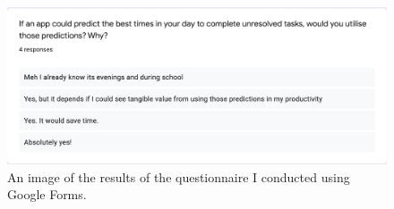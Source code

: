 \begin{figure}[H]
    \centering
    \includegraphics[width=12cm]{./graphics/questionnaire4.png}
    \caption{An image of the results of the questionnaire I conducted using Google Forms.}
	\label{fig:questionnaire}
\end{figure}